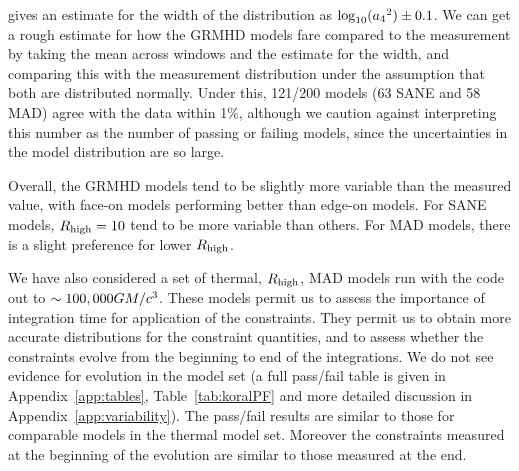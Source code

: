 \citet{Georgiev_2022} gives an estimate for the width of the distribution as $\log_{10}({a_4}^2) \pm 0.1$. We can get a rough estimate for how the GRMHD models fare compared to the measurement by taking the mean across windows and the estimate for the width, and comparing this with the measurement distribution under the assumption that both are distributed normally. Under this, 121/200 models (63 SANE and 58 MAD) agree with the data within 1\%, although we caution against interpreting this number as the number of passing or failing models, since the uncertainties in the model distribution are so large.

Overall, the GRMHD models tend to be slightly more variable than the measured value, with face-on models performing better than edge-on models. For SANE models, $R_\mathrm{high} = 10$ tend to be more variable than others. For MAD models, there is a slight preference for lower $R_\mathrm{high}$.

We have also considered a set of thermal, $R_\mathrm{high}$, MAD models run with the \koral code out to $\sim 100,000GM/c^3$.  These models permit us to assess the importance of integration time for application of the constraints.  They permit us to obtain more accurate distributions for the constraint quantities, and to assess whether the constraints evolve from the beginning to end of the integrations. We do not see evidence for evolution in the \koral model set (a full pass/fail table is given in Appendix~\ref{app:tables}, Table~\ref{tab:koralPF} and more detailed discussion in Appendix~\ref{app:variability}). The \koral pass/fail results are similar to those for comparable models in the \kharma thermal model set. Moreover the constraints measured at the beginning of the evolution are similar to those measured at the end.



